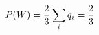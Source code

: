 \documentclass[preview]{standalone}
\begin{document}
\begin{align*}
\special{dvisvgm:raw <g id='unique000'>}P(W)=\frac23\sum_iq_i=\frac23\special{dvisvgm:raw </g>}
\end{align*}
\end{document}
